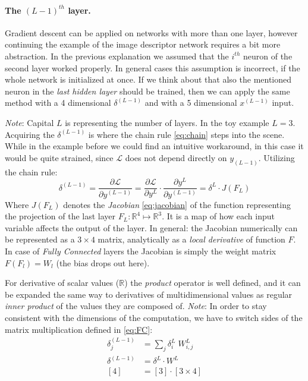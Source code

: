 \paragraph{The $(L-1)^{th}$ layer.} Gradient descent can be applied on networks with more than one layer, 
however continuing the example of the image descriptor network requires a bit more abstraction. 
In the previous explanation we assumed that the $i^{th}$ neuron of the second layer worked properly.
In general cases this assumption is incorrect, if the whole network is initialized at once.
If we think about that also the mentioned neuron in the \emph{last hidden layer} should be trained, 
then we can apply the same method with a 4 dimensional $\delta^{(L-1)}$ and with a 5 dimensional $x^{(L-1)}$ input.

\emph{Note}: Capital $L$ is representing the number of layers. In the toy example $L = 3$.\\
Acquiring the $\delta^{(L-1)}$ is where the chain rule \eqref{eq:chain} steps into the scene.
While in the example before we could find an intuitive workaround, in this case it would be quite strained, since $\mathcal{L}$ does not depend directly on $y_{(L-1)}$.
Utilizing the chain rule:
\begin{equation*}
    \delta^{(L-1)} = 
    \frac{\partial \mathcal{L}}{\partial y^{(L-1)}} = 
    \frac{\partial \mathcal{L}}{\partial y^{L}} \cdot
    \frac{\partial y^{L}}{\partial y^{(L-1)}} = 
    \delta^L \cdot J(F_L)
\end{equation*}
Where $J(F_L)$ denotes the \emph{Jacobian} \eqref{eq:jacobian} of the function representing the projection of the last layer $F_L:\mathbb{R}^4\mapsto \mathbb{R}^3$.
It is a map of how each input variable affects the output of the layer.
In general: the Jacobian numerically can be represented as a $3 \times 4$ matrix, analytically as a \emph{local derivative} of function $F$.
In case of \emph{Fully Connected} layers the Jacobian is simply the weight matrix $F(F_l)=W_l$ (the bias drops out here).

For derivative of scalar values ($\mathbb{R}$) the \emph{product} operator is well defined, 
and it can be expanded the same way to derivatives of multidimensional values as 
regular \emph{inner product} of the values they are composed of.
\emph{Note}: In order to stay consistent with the dimensions of the computation, we have to switch sides of the matrix multiplication defined in \eqref{eq:FC}:
\begin{equation}\label{eq:reverse}
\begin{split}
\delta^{(L-1)}_j &= 
    \sum_j \delta^L_i \; W^L_{i,j} \\
    \delta^{(L-1)} &= \delta^L \cdot W^L\\
    \left[4\right] &= \left[3\right] \cdot \left[3 \times 4\right] 
\end{split}
\end{equation}
